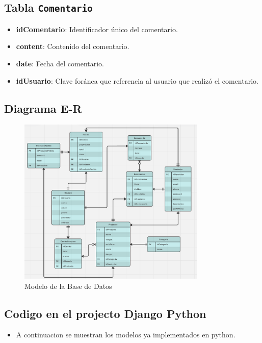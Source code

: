 \documentclass{article}
\begin{document}
\begin{itemize}
\subsection*{Tabla \texttt{Comentario}}
\begin{itemize}[leftmargin=*]
    \item \textbf{idComentario}: Identificador único del comentario.
    \item \textbf{content}: Contenido del comentario.
    \item \textbf{date}: Fecha del comentario.
    \item \textbf{idUsuario}: Clave foránea que referencia al usuario que realizó el comentario.
\end{itemize}

    \subsection*{Diagrama E-R}
    


            \begin{figure}[h]
                \centering
                \includegraphics[width=0.8\textwidth]{img/model.png}
                \caption{Modelo de la Base de Datos}
                \label{fig:modelo_bd}
            \end{figure}
            

	\end{itemize}	
\vspace{10cm}

  	\subsection{Codigo en el projecto Django Python}
\begin{itemize}
    \item A continuacion se muestran los modelos ya implementados en python.
\end{itemize}
\end{document}
